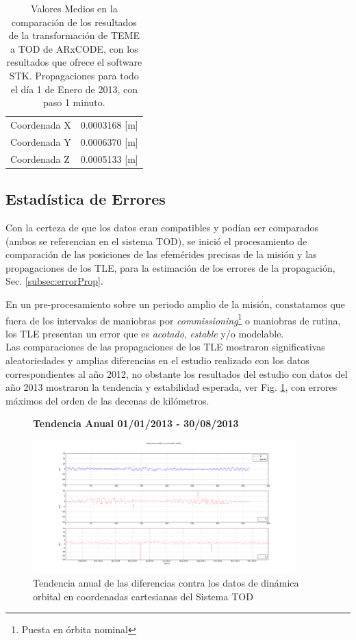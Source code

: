 \begin{table}
\centering
\begin{tabular}{l|c}
  \hline
  Coordenada  X &  0.0003168 [m]\\
  Coordenada Y &  0.0006370 [m]\\
  Coordenada Z &  0.0005133 [m]\\
  \hline
\end{tabular}
\caption{Valores Medios en la comparaci\'on de los resultados de la transformaci\'on de TEME a TOD de ARxCODE, con los resultados que ofrece el software STK. Propagaciones para todo el d\'ia 1 de Enero de 2013, con paso 1 minuto.}
\end{table}

\subsection*{Estad\'istica de Errores}
Con la certeza de que los datos eran compatibles y pod\'ian ser comparados (ambos se referencian en el sistema TOD), se inici\'o el procesamiento de comparaci\'on de las posiciones de las efem\'erides precisas de la misi\'on y las propagaciones de los TLE, para la estimaci\'on de los errores de la propagaci\'on, Sec. \ref{subsec:errorProp}.

En un pre-procesamiento sobre un periodo amplio de la misi\'on, constatamos que fuera de los intervalos de maniobras por {\it{commissioning}}\footnote{Puesta en \'orbita nominal} o maniobras de rutina, los TLE presentan un error que es {\it{acotado}}, {\it{estable}} y/o modelable. \\

Las comparaciones de las propagaciones de los TLE mostraron significativas aleatoriedades y amplias diferencias en el estudio realizado con los datos correspondientes al a\~no 2012, no obstante los resultados del estudio con datos del a\~no 2013 mostraron la tendencia y estabilidad esperada, ver Fig. \ref{fig:sacd2013}, con errores m\'aximos del orden de las decenas de kil\'ometros.


\begin{figure}[!h]
\centering
  \textbf{Tendencia Anual 01/01/2013 - 30/08/2013}\par\medskip
  \includegraphics[width=0.9\textwidth]{imagenes/SACD2013todEjesajustados}
  \caption{Tendencia anual de las diferencias contra los datos de din\'amica orbital en coordenadas cartesianas del Sistema TOD}
  \label{fig:sacd2013}
\end{figure}

